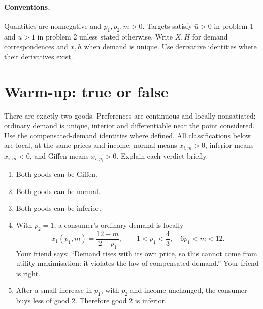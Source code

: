 
\paragraph{Conventions.} Quantities are nonnegative and $p_1,p_2,m>0$.
Targets satisfy $\bar u>0$ in problem 1 and $\bar u>1$ in problem 2 unless
stated otherwise. Write $X,H$ for demand correspondences and $x,h$ when
demand is unique. Use derivative identities where their derivatives exist.

\section*{Warm-up: true or false}
There are exactly two goods. Preferences are continuous and locally
nonsatiated; ordinary demand is unique, interior and differentiable near
the point considered. Use the compensated-demand identities where defined.
All classifications below are local, at the same prices and income:
normal means $x_{i,m}>0$, inferior means $x_{i,m}<0$, and Giffen means
$x_{i,p_i}>0$. Explain each verdict briefly.
\begin{enumerate}[label=\arabic*.]
\item Both goods can be Giffen.
\item Both goods can be normal.
\item Both goods can be inferior.
\item With $p_2=1$, a consumer's ordinary demand is locally
\[
 x_1(p_1,m)=\frac{12-m}{2-p_1},\qquad
 1<p_1<\frac43,\quad 6p_1<m<12.
\]
Your friend says: ``Demand rises with its own price, so this cannot come
from utility maximisation: it violates the law of compensated demand.''
Your friend is right.
\item After a small increase in $p_1$, with $p_2$ and income unchanged,
the consumer buys less of good 2. Therefore good 2 is inferior.
\end{enumerate}

\clearpage
